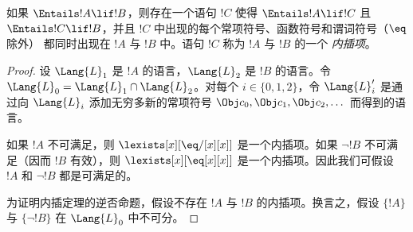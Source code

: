 \documentclass[../../../include/open-logic-section]{subfiles}
\begin{document}


\begin{thm}
如果 $\Entails !A \lif !B$，则存在一个语句 $!C$ 使得
$\Entails !A \lif !C$ 且 $\Entails !C \lif !B$，并且
$!C$ 中出现的每个常项符号、函数符号和谓词符号（$\eq$ 除外）
都同时出现在 $!A$ 与 $!B$ 中。语句 $!C$ 称为 $!A$ 与 $!B$ 的一个
\emph{内插项}。
\end{thm}

\begin{proof}
设 $\Lang{L}_1$ 是 $!A$ 的语言，$\Lang{L}_2$ 是 $!B$ 的语言。令 $\Lang{L}_0 = \Lang{L}_1 \cap \Lang{L}_2$。对每个 $i \in \{0, 1, 2 \}$，令 $\Lang{L}'_i$ 是通过向 $\Lang{L}_i$ 添加无穷多新的常项符号 $\Obj c_0,
\Obj c_1, \Obj c_2, \dots$ 而得到的语言。

如果 $!A$ 不可满足，则 $\lexists[x][\eq/[x][x]]$ 是一个内插项。如果 $\lnot !B$ 不可满足（因而 $!B$ 有效），则 $\lexists[x][\eq[x][x]]$ 是一个内插项。因此我们可假设 $!A$ 和 $\lnot !B$ 都是可满足的。

为证明内插定理的逆否命题，假设不存在 $!A$ 与 $!B$ 的内插项。换言之，假设 $\{!A\}$ 与 $\{\lnot !B\}$ 在 $\Lang{L}_0$ 中不可分。


\end{proof}
\end{document}
